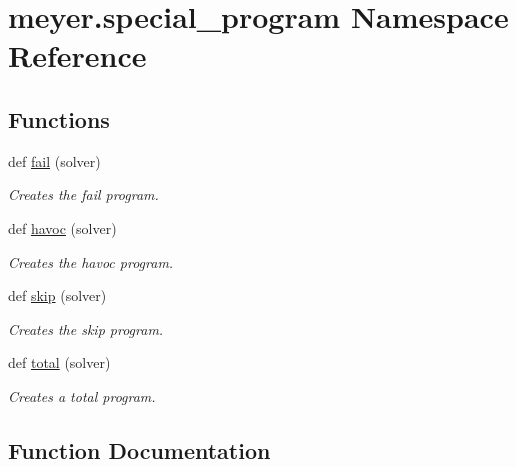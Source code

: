 \hypertarget{namespacemeyer_1_1special__program}{}\section{meyer.\+special\+\_\+program Namespace Reference}
\label{namespacemeyer_1_1special__program}
\subsection*{Functions}
\begin{DoxyCompactItemize}
\item 
def \hyperlink{namespacemeyer_1_1special__program_a1ca0361ff0637d102b69809d581c571e}{fail} (solver)
\begin{DoxyCompactList}\small\item\em Creates the fail program. \end{DoxyCompactList}\item 
def \hyperlink{namespacemeyer_1_1special__program_a82762750ef41bb2f8580570bb8905df5}{havoc} (solver)
\begin{DoxyCompactList}\small\item\em Creates the havoc program. \end{DoxyCompactList}\item 
def \hyperlink{namespacemeyer_1_1special__program_acb9cc59171a05af2110ca447780028c4}{skip} (solver)
\begin{DoxyCompactList}\small\item\em Creates the skip program. \end{DoxyCompactList}\item 
def \hyperlink{namespacemeyer_1_1special__program_a16ef00406a38891967508e7b6b02cd9b}{total} (solver)
\begin{DoxyCompactList}\small\item\em Creates a total program. \end{DoxyCompactList}\end{DoxyCompactItemize}


\subsection{Function Documentation}
\mbox{\label{namespacemeyer_1_1special__program_a1ca0361ff0637d102b69809d581c571e}} 
